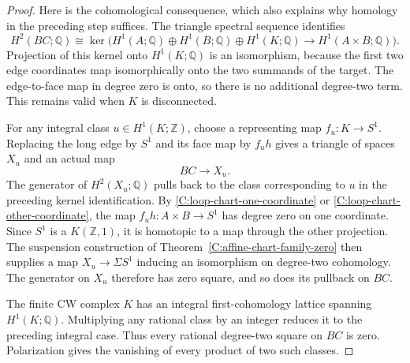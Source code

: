 \begin{proof}
Here is the cohomological consequence, which also explains
why homology in the preceding step suffices.  The triangle
spectral sequence identifies
\[
 H^2(BC;\mathbb Q)\cong
 \ker\bigl(H^1(A;\mathbb Q)\oplus H^1(B;\mathbb Q)
             \oplus H^1(K;\mathbb Q)
           \longrightarrow H^1(A\times B;\mathbb Q)\bigr).
\]
Projection of this kernel onto $H^1(K;\mathbb Q)$ is an
isomorphism, because the first two edge coordinates map
isomorphically onto the two summands of the target.  The
edge-to-face map in degree zero is onto, so there is no
additional degree-two term.  This remains valid when $K$
is disconnected.

For any integral class $u\in H^1(K;\mathbb Z)$, choose a
representing map $f_u:K\to S^1$.  Replacing the long edge
by $S^1$ and its face map by $f_u h$ gives a triangle of
spaces $X_u$ and an actual map
\[
 BC\longrightarrow X_u.
\]
The generator of $H^2(X_u;\mathbb Q)$ pulls back to the
class corresponding to $u$ in the preceding kernel
identification.  By \eqref{C:loop-chart-one-coordinate} or
\eqref{C:loop-chart-other-coordinate}, the map
$f_u h:A\times B\to S^1$ has degree zero on one coordinate.
Since $S^1$ is a $K(\mathbb Z,1)$, it is homotopic to a map
through the other projection.  The suspension construction
of Theorem~\ref{C:affine-chart-family-zero} then supplies a
map $X_u\to\Sigma S^1$ inducing an isomorphism on degree-two
cohomology.
The generator on $X_u$ therefore has zero square, and so
does its pullback on $BC$.

The finite CW complex $K$ has an integral first-cohomology
lattice spanning $H^1(K;\mathbb Q)$.  Multiplying any rational
class by an integer reduces it to the preceding integral
case.  Thus every rational degree-two square on $BC$ is
zero.  Polarization gives the vanishing of every product
of two such classes.
\end{proof}

